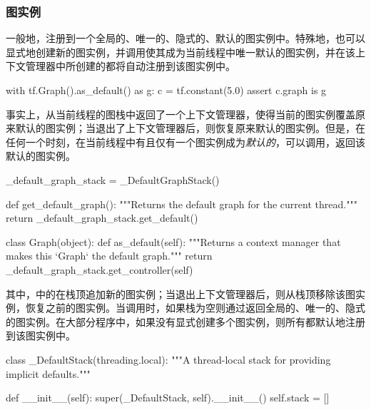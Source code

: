 \begin{content}
\subsubsection{图实例}

一般地，注册到一个全局的、唯一的、隐式的、默认的图实例中。特殊地，\tf{}也可以显式地创建新的图实例，并调用使其成为当前线程中唯一默认的图实例，并在该上下文管理器中所创建的都将自动注册到该图实例中。

\begin{leftbar}
\begin{python}
with tf.Graph().as_default() as g:
  c = tf.constant(5.0)
  assert c.graph is g
\end{python}
\end{leftbar}

事实上，从当前线程的图栈中返回了一个上下文管理器，使得当前的图实例覆盖原来默认的图实例；当退出了上下文管理器后，则恢复原来默认的图实例。但是，在任何一个时刻，在当前线程中有且仅有一个图实例成为\emph{默认的}，可以调用，返回该默认的图实例。

\begin{leftbar}
\begin{python}
_default_graph_stack = _DefaultGraphStack()

def get_default_graph():
  """Returns the default graph for the current thread."""
  return _default_graph_stack.get_default()

class Graph(object):
  def as_default(self):
    """Returns a context manager that makes this `Graph` the default graph."""
    return _default_graph_stack.get_controller(self)
\end{python}
\end{leftbar}

其中，中的在栈顶追加新的图实例；当退出上下文管理器后，则从栈顶移除该图实例，恢复之前的图实例。当调用时，如果栈为空则通过返回全局的、唯一的、隐式的图实例。在大部分\tf{}程序中，如果没有显式创建多个图实例，则所有都默认地注册到该图实例中。

\begin{leftbar}
\begin{python}
class _DefaultStack(threading.local):
  """A thread-local stack for providing implicit defaults."""

  def __init__(self):
    super(_DefaultStack, self).__init__()
    self.stack = []


\end{python}
\end{leftbar}
\end{content}
